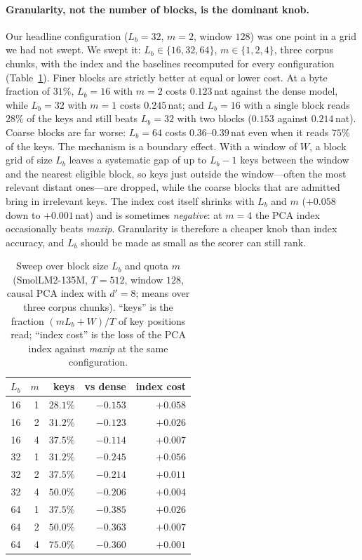 \documentclass[sigconf,nonacm,11pt]{acmart}
\begin{document}
\paragraph{Granularity, not the number of blocks, is the dominant knob.} Our
headline configuration ($L_b=32$, $m=2$, window $128$) was one point in a grid we
had not swept. We swept it: $L_b\in\{16,32,64\}$, $m\in\{1,2,4\}$, three corpus
chunks, with the index and the baselines recomputed for every configuration
(Table~\ref{tab:sweep}). Finer blocks are strictly better at equal or lower cost.
At a byte fraction of $31\%$, $L_b=16$ with $m=2$ costs $0.123$\,nat against the
dense model, while $L_b=32$ with $m=1$ costs $0.245$\,nat; and $L_b=16$ with a
single block reads $28\%$ of the keys and still beats $L_b=32$ with two blocks
($0.153$ against $0.214$\,nat). Coarse blocks are far worse: $L_b=64$ costs
$0.36$--$0.39$\,nat even when it reads $75\%$ of the keys. The mechanism is a
boundary effect. With a window of $W$, a block grid of size $L_b$ leaves a
systematic gap of up to $L_b-1$ keys between the window and the nearest eligible
block, so keys just outside the window---often the most relevant distant
ones---are dropped, while the coarse blocks that are admitted bring in irrelevant
keys. The index cost itself shrinks with $L_b$ and $m$ ($+0.058$ down to
$+0.001$\,nat) and is sometimes \emph{negative}: at $m=4$ the PCA index
occasionally beats \emph{maxip}. Granularity is therefore a cheaper knob than
index accuracy, and $L_b$ should be made as small as the scorer can still rank.

\begin{table}[t]
\centering
\caption{Sweep over block size $L_b$ and quota $m$ (SmolLM2-135M, $T=512$,
window $128$, causal PCA index with $d'=8$; means over three corpus chunks).
``keys'' is the fraction $(mL_b+W)/T$ of key positions read; ``index cost'' is
the loss of the PCA index against \emph{maxip} at the same configuration.}
\label{tab:sweep}
\begin{tabular}{rrrrr}
\toprule
$L_b$ & $m$ & keys & vs dense & index cost \\
\midrule
16 & 1 & $28.1\%$ & $-0.153$ & $+0.058$ \\
16 & 2 & $31.2\%$ & $-0.123$ & $+0.026$ \\
16 & 4 & $37.5\%$ & $-0.114$ & $+0.007$ \\
32 & 1 & $31.2\%$ & $-0.245$ & $+0.056$ \\
32 & 2 & $37.5\%$ & $-0.214$ & $+0.011$ \\
32 & 4 & $50.0\%$ & $-0.206$ & $+0.004$ \\
64 & 1 & $37.5\%$ & $-0.385$ & $+0.026$ \\
64 & 2 & $50.0\%$ & $-0.363$ & $+0.007$ \\
64 & 4 & $75.0\%$ & $-0.360$ & $+0.001$ \\
\bottomrule
\end{tabular}
\end{table}
\end{document}
